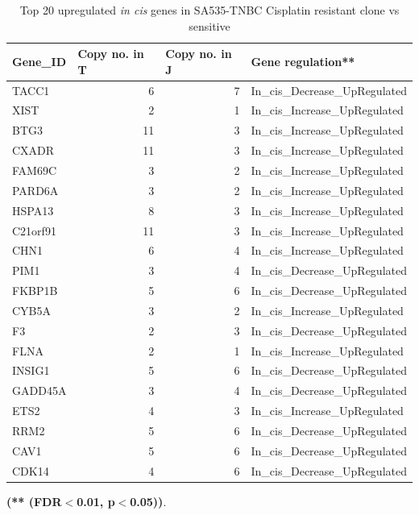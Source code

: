  \begin{table}[htbp]
   \centering
   \caption{Top 20 upregulated \textit{in cis} genes in SA535-TNBC Cisplatin resistant clone vs sensitive}
     \begin{tabular}{|l|r|r|l|}
     \hline
     \textbf{Gene\_ID} & \multicolumn{1}{|l|}{\textbf{Copy no. in T}} & \multicolumn{1}{|l|}{\textbf{Copy no. in J}} & \textbf{Gene regulation**} \\
     \hline
     TACC1 & 6 & 7 & In\_cis\_Decrease\_UpRegulated \\
     XIST & 2 & 1 & In\_cis\_Increase\_UpRegulated \\
     BTG3 & 11 & 3 & In\_cis\_Increase\_UpRegulated \\
     CXADR & 11 & 3 & In\_cis\_Increase\_UpRegulated \\
     FAM69C & 3 & 2 & In\_cis\_Increase\_UpRegulated \\
     PARD6A & 3 & 2 & In\_cis\_Increase\_UpRegulated \\
     HSPA13 & 8 & 3 & In\_cis\_Increase\_UpRegulated \\
     C21orf91 & 11 & 3 & In\_cis\_Increase\_UpRegulated \\
     CHN1 & 6 & 4 & In\_cis\_Increase\_UpRegulated \\
     PIM1 & 3 & 4 & In\_cis\_Decrease\_UpRegulated \\
     FKBP1B & 5 & 6 & In\_cis\_Decrease\_UpRegulated \\
     CYB5A & 3 & 2 & In\_cis\_Increase\_UpRegulated \\
     F3 & 2 & 3 & In\_cis\_Decrease\_UpRegulated \\
     FLNA & 2 & 1 & In\_cis\_Increase\_UpRegulated \\
     INSIG1 & 5 & 6 & In\_cis\_Decrease\_UpRegulated \\
     GADD45A & 3 & 4 & In\_cis\_Decrease\_UpRegulated \\
     ETS2 & 4 & 3 & In\_cis\_Increase\_UpRegulated \\
     RRM2 & 5 & 6 & In\_cis\_Decrease\_UpRegulated \\
     CAV1 & 5 & 6 & In\_cis\_Decrease\_UpRegulated \\
     CDK14 & 4 & 6 & In\_cis\_Decrease\_UpRegulated \\
     \hline
     \end{tabular}%
   \label{tab:top20SA535upregulatedcispl}%
 
   \small\textbf{(** (FDR$<$0.01, p$<$0.05))}.
 \end{table}%
